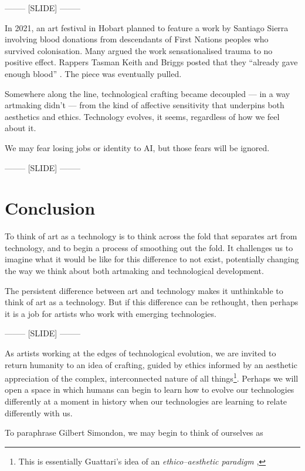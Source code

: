 \documentclass[letter:wpaper]{article}
\begin{document}
    -------- [SLIDE] --------
    
    In 2021, an art festival in Hobart planned to feature a work by Santiago Sierra involving blood donations from descendants of First Nations peoples who survived colonisation. Many argued the work sensationalised trauma to no positive effect. Rappers Tasman Keith and Briggs posted that they ``already gave enough blood'' \citep{DrkMfBld2021}. The piece was eventually pulled.
    
    Somewhere along the line, technological crafting became decoupled — in a way artmaking didn’t — from the kind of affective sensitivity that underpins both aesthetics and ethics. Technology evolves, it seems, regardless of how we feel about it.
    
    We may fear losing jobs or identity to AI, but those fears will be ignored.
     
-------- [SLIDE] --------

\section{Conclusion}

    To think of art as a technology is to think across the fold that separates art from technology, and to begin a process of smoothing out the fold. It challenges us to imagine what it would be like for this difference to not exist, potentially changing the way we think about both artmaking and technological development.
    
    The persistent difference between art and technology makes it unthinkable to think of art as a technology. But if this difference can be rethought, then perhaps it is a job for artists who work with emerging technologies. 
    
-------- [SLIDE] --------

    As artists working at the edges of technological evolution, we are invited to return humanity to an idea of crafting, guided by ethics informed by an aesthetic appreciation of the complex, interconnected nature of all things\footnote{
        This is essentially Guattari's idea of an \emph{ethico–aesthetic paradigm} \citep[p.131]{GuattariChsmss1995}, 
    }. Perhaps we will open a space in which humans can begin to learn how to evolve our technologies differently at a moment in history when our technologies are learning to relate differently with us.
    
    To paraphrase Gilbert Simondon, we may begin to think of ourselves as
\end{document}

